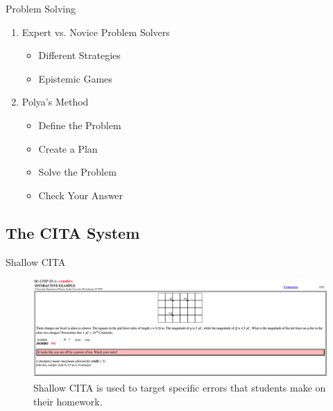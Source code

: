 \documentclass[xcolor=x11names,compress]{beamer}
\begin{document}
\begin{frame}{Problem Solving}
	\begin{enumerate}
		\item Expert vs. Novice Problem Solvers
		\begin{itemize}
			\item Different Strategies
			\item Epistemic Games
		\end{itemize}
		\item Polya's Method
		\begin{itemize}
			\item Define the Problem
			\item Create a Plan
			\item Solve the Problem
			\item Check Your Answer
		\end{itemize}
	\end{enumerate}
\end{frame}

\subsection{The CITA System}

\begin{frame}{Shallow CITA}
	\begin{figure}
		\includegraphics[width=1.0\textwidth]{img/shallow_cita_example.png}
		\caption{Shallow CITA is used to target specific errors that students make on their homework.}
		\label{fig:shallow_cita_example}
	\end{figure}
\end{frame}
\end{document}
